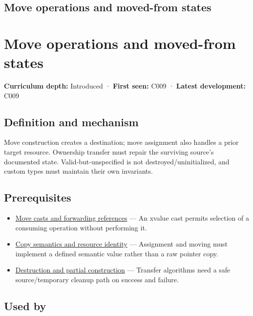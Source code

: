 \hypertarget{appendix-5636651017c2}{}
\section*{Move operations and moved-from states}
\chapter{Move operations and moved-from states}\label{appendix-5636651017c2-move-operations-and-moved-from-states}

\textbf{Curriculum depth:} Introduced · \textbf{First seen:} C009 · \textbf{Latest development:} C009

\section{Definition and mechanism}\label{appendix-5636651017c2-definition-and-mechanism}

Move construction creates a destination; move assignment also handles a prior target resource. Ownership transfer must repair the surviving source's documented state. Valid-but-unspecified is not destroyed/uninitialized, and custom types must maintain their own invariants.

\section{Prerequisites}\label{appendix-5636651017c2-prerequisites}

\begin{itemize}
\tightlist
\item
  \hyperref[appendix-0104b704fb11]{Move casts and forwarding references} --- An xvalue cast permits selection of a consuming operation without performing it.
\item
  \hyperref[appendix-1340cd1ce582]{Copy semantics and resource identity} --- Assignment and moving must implement a defined semantic value rather than a raw pointer copy.
\item
  \hyperref[appendix-9bfe377cef7a]{Destruction and partial construction} --- Transfer algorithms need a safe source/temporary cleanup path on success and failure.
\end{itemize}

\section{Used by}\label{appendix-5636651017c2-used-by}

